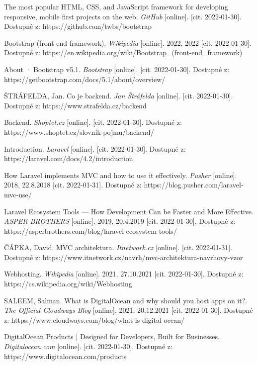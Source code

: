\begin{thebibliography}{32}
The most popular HTML, CSS, and JavaScript framework for developing responsive, mobile first projects on the web. \textit{GitHub} [online]. [cit. 2022-01-30]. Dostupné z: https://github.com/twbs/bootstrap

Bootstrap (front-end framework). \textit{Wikipedia} [online]. 2022, 2022 [cit. 2022-01-30]. Dostupné z: https://en.wikipedia.org/wiki/Bootstrap\_(front-end\_framework)

About · Bootstrap v5.1. \textit{Bootstrap} [online]. [cit. 2022-01-30]. Dostupné z: https://getbootstrap.com/docs/5.1/about/overview/

ŠTRÁFELDA, Jan. Co je backend. \textit{Jan Štráfelda} [online]. [cit. 2022-01-30]. Dostupné z: https://www.strafelda.cz/backend

Backend. \textit{Shoptet.cz} [online]. [cit. 2022-01-30]. Dostupné z: https://www.shoptet.cz/slovnik-pojmu/backend/

Introduction. \textit{Laravel} [online]. [cit. 2022-01-30]. Dostupné z: https://laravel.com/docs/4.2/introduction

How Laravel implements MVC and how to use it effectively. \textit{Pusher} [online]. 2018, 22.8.2018 [cit. 2022-01-31]. Dostupné z: https://blog.pusher.com/laravel-mvc-use/

Laravel Ecosystem Tools --- How Development Can be Faster and More Effective. \textit{ASPER BROTHERS} [online]. 2019, 20.4.2019 [cit. 2022-01-30]. Dostupné z: https://asperbrothers.com/blog/laravel-ecosystem-tools/

ČÁPKA, David. MVC architektura. \textit{Itnetwork.cz} [online]. [cit. 2022-01-31]. Dostupné z: https://www.itnetwork.cz/navrh/mvc-architektura-navrhovy-vzor

Webhosting. \textit{Wikipedia} [online]. 2021, 27.10.2021 [cit. 2022-01-30]. Dostupné z: https://cs.wikipedia.org/wiki/Webhosting

SALEEM, Salman. What is DigitalOcean and why should you host apps on it?. \textit{The Official Cloudways Blog} [online]. 2021, 20.12.2021 [cit. 2022-01-30]. Dostupné z: https://www.cloudways.com/blog/what-is-digital-ocean/

DigitalOcean Products | Designed for Developers, Built for Businesses. \textit{Digitalocean.com} [online]. [cit. 2022-01-30]. Dostupné z: https://www.digitalocean.com/products


\end{thebibliography}
